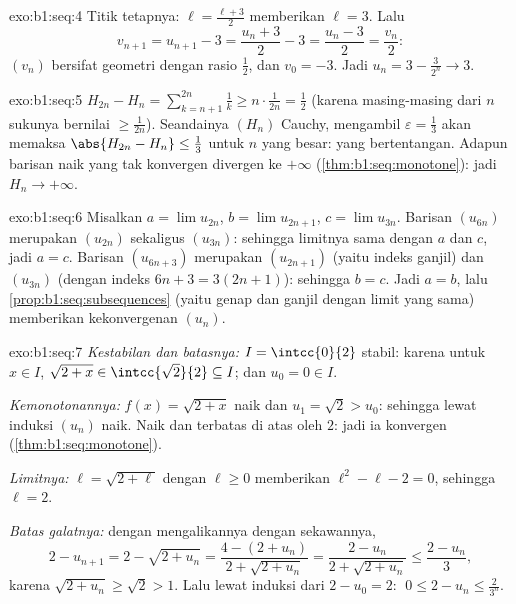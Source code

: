 \begin{solution}{exo:b1:seq:4}
Titik tetapnya: $\ell = \frac{\ell + 3}{2}$ memberikan $\ell = 3$. Lalu
\[
v_{n+1} = u_{n+1} - 3 = \frac{u_n + 3}{2} - 3 = \frac{u_n - 3}{2} =
\frac{v_n}{2}:
\]
$(v_n)$ bersifat geometri dengan rasio $\frac12$, dan $v_0 = -3$. Jadi $u_n = 3 -
\frac{3}{2^n} \to 3$.
\end{solution}

\begin{solution}{exo:b1:seq:5}
$H_{2n} - H_n = \sum_{k=n+1}^{2n} \frac 1k \geq n \cdot
\frac{1}{2n} = \frac12$ (karena masing-masing dari $n$ sukunya bernilai $\geq
\frac{1}{2n}$). Seandainya $(H_n)$ Cauchy, mengambil $\varepsilon =
\frac13$ akan memaksa $\abs{H_{2n} - H_n} \leq \frac13$ untuk $n$ yang
besar: yang bertentangan. Adapun barisan naik yang tak konvergen divergen ke
$+\infty$ (\cref{thm:b1:seq:monotone}): jadi $H_n \to +\infty$.
\end{solution}

\begin{solution}{exo:b1:seq:6}
Misalkan $a = \lim u_{2n}$, $b = \lim u_{2n+1}$, $c = \lim u_{3n}$. Barisan
$(u_{6n})$ merupakan  $(u_{2n})$ sekaligus
$(u_{3n})$: sehingga limitnya sama dengan $a$ dan $c$, jadi $a = c$. Barisan
$(u_{6n+3})$ merupakan  $(u_{2n+1})$ (yaitu indeks ganjil) dan
$(u_{3n})$ (dengan indeks $6n + 3 = 3(2n+1)$): sehingga $b = c$. Jadi $a = b$,
lalu \cref{prop:b1:seq:subsequences} (yaitu genap dan ganjil dengan limit yang
sama) memberikan kekonvergenan $(u_n)$.
\end{solution}

\begin{solution}{exo:b1:seq:7}
\emph{Kestabilan dan batasnya:} $I = \intcc{0}{2}$ stabil: karena untuk $x \in
I$, $\sqrt{2 + x} \in \intcc{\sqrt 2}{2} \subseteq I$; dan $u_0 = 0
\in I$.

\emph{Kemonotonannya:} $f(x) = \sqrt{2+x}$ naik dan $u_1 =
\sqrt 2 > u_0$: sehingga lewat induksi $(u_n)$ naik. Naik dan
terbatas di atas oleh $2$: jadi ia konvergen
(\cref{thm:b1:seq:monotone}).

\emph{Limitnya:} $\ell = \sqrt{2 + \ell}$ dengan $\ell \geq 0$ memberikan
$\ell^2 - \ell - 2 = 0$, sehingga $\ell = 2$.

\emph{Batas galatnya:} dengan mengalikannya dengan sekawannya,
\[
2 - u_{n+1} = 2 - \sqrt{2 + u_n}
= \frac{4 - (2 + u_n)}{2 + \sqrt{2+u_n}}
= \frac{2 - u_n}{2 + \sqrt{2 + u_n}}
\leq \frac{2 - u_n}{3},
\]
karena $\sqrt{2 + u_n} \geq \sqrt 2 > 1$. Lalu lewat induksi dari $2 - u_0
= 2$: $\;0 \leq 2 - u_n \leq \frac{2}{3^n}$.
\end{solution}

